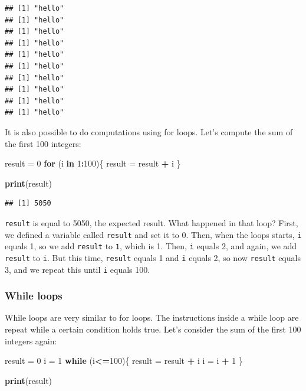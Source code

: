 \documentclass[]{gitbook}
\newenvironment{Shaded}{\begin{snugshade}}{\end{snugshade}}
\newcommand{\ControlFlowTok}[1]{\textcolor[rgb]{0.13,0.29,0.53}{\textbf{#1}}}
\newcommand{\DecValTok}[1]{\textcolor[rgb]{0.00,0.00,0.81}{#1}}
\newcommand{\KeywordTok}[1]{\textcolor[rgb]{0.13,0.29,0.53}{\textbf{#1}}}
\newcommand{\NormalTok}[1]{#1}
\newcommand{\OperatorTok}[1]{\textcolor[rgb]{0.81,0.36,0.00}{\textbf{#1}}}
\newcommand{\StringTok}[1]{\textcolor[rgb]{0.31,0.60,0.02}{#1}}
\begin{document}
\begin{verbatim}
## [1] "hello"
## [1] "hello"
## [1] "hello"
## [1] "hello"
## [1] "hello"
## [1] "hello"
## [1] "hello"
## [1] "hello"
## [1] "hello"
## [1] "hello"
\end{verbatim}

It is also possible to do computations using for loops. Let's compute the sum of the first
100 integers:

\begin{Shaded}
\begin{Highlighting}[]
\NormalTok{result =}\StringTok{ }\DecValTok{0}
\ControlFlowTok{for}\NormalTok{ (i }\ControlFlowTok{in} \DecValTok{1}\OperatorTok{:}\DecValTok{100}\NormalTok{)\{}
\NormalTok{  result =}\StringTok{ }\NormalTok{result }\OperatorTok{+}\StringTok{ }\NormalTok{i}
\NormalTok{\}}

\KeywordTok{print}\NormalTok{(result)}
\end{Highlighting}
\end{Shaded}

\begin{verbatim}
## [1] 5050
\end{verbatim}

\texttt{result} is equal to 5050, the expected result. What happened in that loop? First, we defined a
variable called \texttt{result} and set it to 0. Then, when the loops starts, \texttt{i} equals 1, so we add
\texttt{result} to \texttt{1}, which is 1. Then, \texttt{i} equals 2, and again, we add \texttt{result} to \texttt{i}. But this time,
\texttt{result} equals 1 and \texttt{i} equals 2, so now \texttt{result} equals 3, and we repeat this until \texttt{i}
equals 100.

\hypertarget{while-loops}{%
\subsubsection{While loops}\label{while-loops}}

While loops are very similar to for loops. The instructions inside a while loop are repeat while a
certain condition holds true. Let's consider the sum of the first 100 integers again:

\begin{Shaded}
\begin{Highlighting}[]
\NormalTok{result =}\StringTok{ }\DecValTok{0}
\NormalTok{i =}\StringTok{ }\DecValTok{1}
\ControlFlowTok{while}\NormalTok{ (i}\OperatorTok{<=}\DecValTok{100}\NormalTok{)\{}
\NormalTok{  result =}\StringTok{ }\NormalTok{result }\OperatorTok{+}\StringTok{ }\NormalTok{i}
\NormalTok{  i =}\StringTok{ }\NormalTok{i }\OperatorTok{+}\StringTok{ }\DecValTok{1}
\NormalTok{\}}

\KeywordTok{print}\NormalTok{(result)}
\end{Highlighting}
\end{Shaded}
\end{document}
